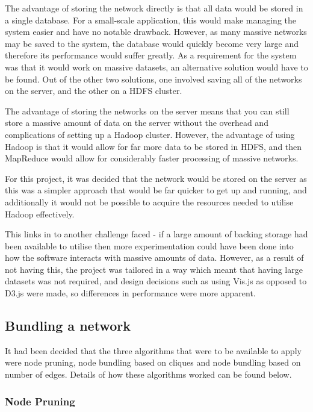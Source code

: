 \documentclass[../dissertation.tex]{subfiles}
\begin{document}
The advantage of storing the network directly is that all data would be stored in a single database. For a small-scale application, this would make managing the system easier and have no notable drawback. However, as many massive networks may be saved to the system, the database would quickly become very large and therefore its performance would suffer greatly. As a requirement for the system was that it would work on massive datasets, an alternative solution would have to be found. Out of the other two solutions, one involved saving all of the networks on the server, and the other on a HDFS cluster. 

The advantage of storing the networks on the server means that you can still store a massive amount of data on the server without the overhead and complications of setting up a Hadoop cluster. However, the advantage of using Hadoop is that it would allow for far more data to be stored in HDFS, and then MapReduce would allow for considerably faster processing of massive networks.

For this project, it was decided that the network would be stored on the server as this was a simpler approach that would be far quicker to get up and running, and additionally it would not be possible to acquire the resources needed to utilise Hadoop effectively.

This links in to another challenge faced - if a large amount of backing storage had been available to utilise then more experimentation could have been done into how the software interacts with massive amounts of data. However, as a result of not having this, the project was tailored in a way which meant that having large datasets was not required, and design decisions such as using Vis.js as opposed to D3.js were made, so differences in performance were more apparent.

\subsection{Bundling a network}

It had been decided that the three algorithms that were to be available to apply were node pruning, node bundling based on cliques and node bundling based on number of edges. Details of how these algorithms worked can be found below.

\subsubsection{Node Pruning}
\label{sec:impl-node-prun}
\end{document}
